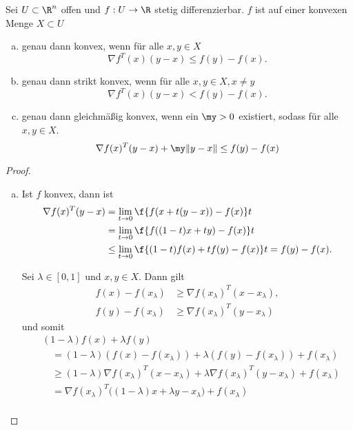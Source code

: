 \begin{st} \label{2.16}
	Sei $U \subset \R^n$ offen und $f: U \to \R$ stetig differenzierbar.
	$f$ ist auf einer konvexen Menge $X \subset U$
	\begin{enumerate}[(a)]
		\item
			genau dann konvex, wenn für alle $x,y \in X$
			\[
				\nabla f^T(x) (y-x)
				\le f(y) - f(x).
			\]
		\item
			genau dann strikt konvex, wenn für alle $x,y \in X, x \neq y$
			\[
				\nabla f^T(x) (y-x)
				< f(y) - f(x).
			\]
		\item
			genau dann gleichmäßig konvex, wenn ein $\my > 0$ existiert, sodass für alle $x,y \in X$.
			\[
				\nabla f(x)^T (y-x) + \my \|y-x\|
				\le f(y) - f(x)
			\]
	\end{enumerate}
	\begin{proof}
		\begin{enumerate}[(a)]
			\item
				\begin{segnb}[„$\implies$“]
					Ist $f$ konvex, dann ist
					\begin{align*}
						\nabla f(x)^T (y-x)
						&= \lim_{t \to 0} \f {f(x+t(y-x)) - f(x)}t \\
						&= \lim_{t \to 0} \f {f((1-t)x + ty) - f(x)}t \\
						&\le \lim_{t \to 0} \f{(1-t)f(x) + tf(y) - f(x)}t
						= f(y) - f(x).
					\end{align*}
				\end{segnb}
				\begin{segnb}[„$\impliedby$“]
					Sei $\lambda \in [0,1]$ und $x,y \in X$.
					Dann gilt
					\begin{align*}
						f(x) - f(x_\lambda)
						&\ge \nabla f(x_\lambda)^T(x-x_\lambda), \\
						f(y) - f(x_\lambda)
						&\ge \nabla f(x_\lambda)^T(y-x_\lambda)
					\end{align*}
					und somit
					\begin{align*}
						&(1-\lambda) f(x) + \lambda f(y) \\
						&\quad= (1-\lambda)(f(x) - f(x_\lambda)) + \lambda (f(y) - f(x_\lambda)) + f(x_\lambda) \\
						&\quad\ge (1-\lambda) \nabla f(x_\lambda)^T (x-x_\lambda) + \lambda \nabla f(x_\lambda)^T (y-x_\lambda) + f(x_\lambda) \\
						&\quad= \nabla f(x_\lambda)^T \big( (1-\lambda) x + \lambda y - x_\lambda \big) + f(x_\lambda) \\

\end{align*}
\end{segnb}
\end{enumerate}
\end{proof}
\end{st}

